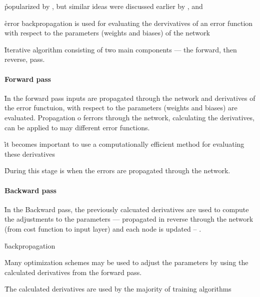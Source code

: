 
\r{popularized by , but similar ideas were discussed earlier by , and }

\r{error backpropagation is used for evaluating the dervivatives of an error function with respect to the parameters (weights and biases) of the network}

\r{Iterative algorithm consisting of two main components --- the forward, then reverse, pass.}



\paragraph{Forward pass}

\r{In the forward pass inputs are propagated through the network and derivatives of the error functuion, with respect to the parameters (weights and biases) are evaluated. Propagation o ferrors through the network, calculating the derivatives, can be applied to may different error functions.}

\r{it becomes important to use a computationally efficient method for evaluating these derivatives }

\r{During this stage is when the errors are propagated through the network.}

\paragraph{Backward pass}

\r{In the Backward pass, the previously calcuated derivatives are used to compute the adjustments to the parameters --- propagated in reverse through the network (from cost function to input layer) and each node is updated -- .}

\r{backpropagation\cite{alber2018backprop}}

\r{Many optimization schemes  may be used to adjust the parameters by using the calculated derivatives from the forward pass.}

\r{The calculated derivatives are used by the majority of training algorithms}

